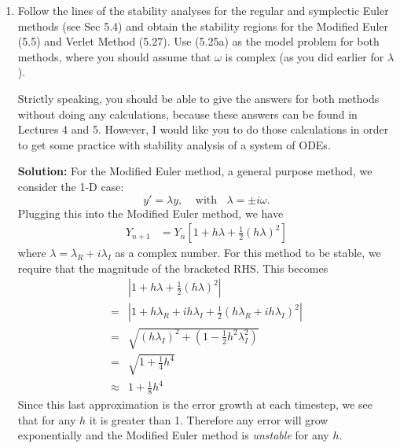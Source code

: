 \documentclass[11pt]{article}
\def\f{\frac }
\begin{document}
\begin{enumerate}
\clearpage
\pagebreak
\item Follow the lines of the stability analyses for the regular and symplectic Euler methods (see Sec 5.4) and obtain the stability regions for the Modified Euler (5.5) and Verlet Method (5.27).
Use (5.25a) as the model problem for both methods, where you should assume that $\omega$ is complex (as you did earlier for $\lambda$).

Strictly speaking, you should be able to give the answers for both methods without doing any calculations, because these answers can be found in Lectures 4 and 5.
However, I would like you to do those calculations in order to get some practice with stability analysis of a system of ODEs.

\bigskip
\textbf{Solution:} For the Modified Euler method, a general purpose method, we consider the 1-D case:
\[ y' = \lambda y ,~~~~~\text{with} ~~~~\lambda = \pm i \omega .\]
Plugging this into the Modified Euler method, we have 
\begin{align*} Y_{n+1} &= Y_n \left [ 1 + h \lambda + \f{1}{2} (h\lambda )^2 \right ] \end{align*}
where $\lambda = \lambda _R + i \lambda _I$ as a complex number.
For this method to be stable, we require that the magnitude of the bracketed RHS.
This becomes
\begin{align*} & \left |1 + h \lambda + \f{1}{2} (h\lambda )^2 \right |\\
= & \left |1 + h \lambda_R + ih \lambda_I + \f{1}{2} (h \lambda_R + ih \lambda_I )^2 \right |\\
= & \sqrt{ (h \lambda_I)^2 + \left (1- \f{1}{2} h^2 \lambda_I ^2 \right) }\\
= & \sqrt{ 1+ \f{1}{4} h^4 } \\
\approx & 1 + \f{1}{8} h^4\end{align*}
Since this last approximation is the error growth at each timestep, we see that for any $h$ it is greater than 1.
Therefore any error will grow exponentially and the Modified Euler method is {\em unstable} for any $h$.


\end{enumerate}
\end{document}
